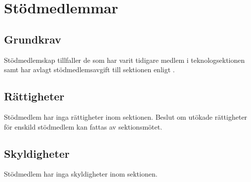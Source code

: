 \section{Stödmedlemmar}

\subsection{Grundkrav}
Stödmedlemskap tillfaller de som har varit tidigare medlem i teknologsektionen samt har avlagt stödmedlemsavgift till sektionen enligt .

\subsection{Rättigheter}
Stödmedlem har inga rättigheter inom sektionen. Beslut om utökade rättigheter för enskild stödmedlem kan fattas av sektionsmötet.

\subsection{Skyldigheter}
Stödmedlem har inga skyldigheter inom sektionen.

